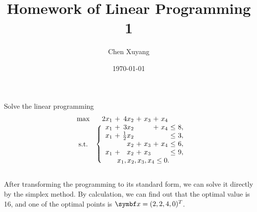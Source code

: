 \documentclass{assignment}[2019/10/15]
\title{Homework of Linear Programming 1}
\author{Chen Xuyang}
\date{\today}
\institute{School of Mathematical Science}
\begin{document}
    \maketitle
    \begin{problem}\label{pr:1}
        Solve the linear programming
        \begin{equation}
            \begin{blockarray}{c*{4}{r@{\hspace{0.33em}}c@{\hspace{0.33em}}}l}
                \max & 2x_1 & +&4x_2 & +&x_3 & +&x_4\\
                \begin{block}{\BAmultirow{3em}\{*{4}{r@{\hspace{0.33em}}c@{\hspace{0.33em}}}l}
                    \centering\text{s.t.} & x_1 & +&3x_2 && & +&x_4 & \leq & 8,\\
                    & x_1 & + &\tfrac{1}{2}x_2 & &&& & \leq & 3,\\
                    & && x_2 & +& x_3 & + &x_4 &\leq & 6,\\
                    & x_1&+&x_2&+&x_3&&&\leq &9,\\
                    \begin{block*}{c\BAmulticolumn{9}{c}}
                        & x_1, x_2, x_3, x_4\leq 0.\\
                    \end{block*}
                \end{block}
            \end{blockarray}
        \end{equation}
    \end{problem}
    \begin{solution}
        After transforming the programming to its standard form, we can solve it directly by the simplex method. By calculation, we can find out that the optimal value is 16, and one of the optimal points is $\vect{x} = (2, 2, 4, 0)^T$.
    \end{solution}
\end{document}
